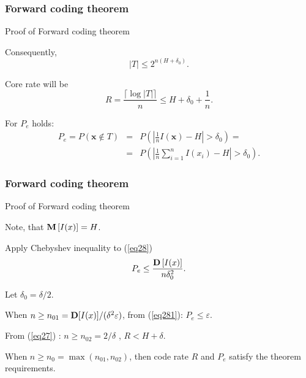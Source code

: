 \documentclass[14pt]{beamer}
\renewcommand{\vec}[1]{\ensuremath{\boldsymbol{#1}}}
\begin{document}
\begin{frame}
\frametitle{Forward coding theorem}
Proof of Forward coding theorem
\begin{itemize}
\small{  

    \item Consequently,
    \begin{equation}
    \label{eq26}
    \vert T\vert \le 2^{n(H + \delta _0 )}.
    \end{equation}

    \item Core rate will be
    \begin{equation}
    \label{eq27} R =\frac{ \lceil \log  \vert T\vert  \rceil}{n} \le H
    + \delta _0+\frac{1}{n} .
    \end{equation}

    \item For $P_e $ holds:
    \begin{eqnarray}
    P_e = P(\vec x \notin T) &=& P\left( {\left| {\frac{1}{n}I(\vec
    x) - H} \right| > \delta _0 } \right)= \nonumber \\
    \label{eq28}
    &=& P\left( {\left| {\frac{1}{n}\sum\limits_{i = 1}^n
    {I(x_i )} - H} \right|
    > \delta _0 } \right).
    \end{eqnarray}
}
\end{itemize}
\end{frame}



\begin{frame}
\frametitle{Forward coding theorem}
Proof of Forward coding theorem
\begin{itemize}
\small{  

    \item Note, that ${\rm {\bf M}}\left[ {I(x)} \right] = H$. 
    
    \item Apply Chebyshev inequality to (\ref{eq28}) 
    \begin{equation}
    \label{eq281} P_e \le \frac {{\rm {\bf D}}\left[ {I(x)}
    \right]}{n\delta _0^2 }.
    \end{equation}

    \item Let $\delta_0 = \delta / 2$. 
    \item When $n \geq n_{01} = {{\rm {\bf D}}[I(x)]} / (\delta ^2\varepsilon )$, from  (\ref{eq281}):
    $P_e \le \varepsilon $. 
    
    \item From (\ref{eq27}) :
    $n \ge n_{02}=2/\delta$ , $R < H + \delta $.
    \item When $n \geq n_0=\max(n_{01},n_{02})$, then code rate $R$ and $P_e$ satisfy the theorem requirements.  
}
\end{itemize}
\end{frame}
\end{document}
